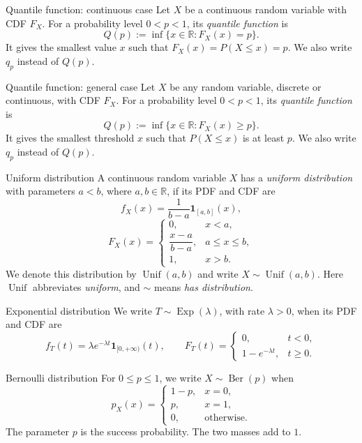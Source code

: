\documentclass[12pt,a4paper,oneside]{report}
\begin{document}
\begin{frameddefn}{Quantile function: continuous case}
\label{def:quantile-continuous}
Let $X$ be a continuous random variable with CDF $F_X$. For a
probability level $0<p<1$, its \emph{quantile function} is
\[
  Q(p):=\inf\{x\in\mathbb R:F_X(x)=p\}.
\]
It gives the smallest value $x$ such that $F_X(x)=P(X\leq x)=p$.
We also write $q_p$ instead of $Q(p)$.
\end{frameddefn}

\begin{frameddefn}{Quantile function: general case}
\label{def:quantile-general}
Let $X$ be any random variable, discrete or continuous, with CDF
$F_X$. For a probability level $0<p<1$, its \emph{quantile function} is
\[
  Q(p):=\inf\{x\in\mathbb R:F_X(x)\geq p\}.
\]
It gives the smallest threshold $x$ such that
$P(X\leq x)$ is at least $p$. We also write $q_p$ instead of $Q(p)$.
\end{frameddefn}

\begin{frameddefn}{Uniform distribution}
\label{def:uniform-distribution}
A continuous random variable $X$ has a \emph{uniform distribution}
with parameters $a<b$, where $a,b\in\mathbb R$, if its PDF and CDF
are
\[
  f_X(x)=\frac{1}{b-a}\mathbf 1_{[a,b]}(x),
\]
\[
  F_X(x)=
  \begin{cases}
    0, & x<a,\\
    \dfrac{x-a}{b-a}, & a\leq x\leq b,\\
    1, & x>b.
  \end{cases}
\]
We denote this distribution by $\operatorname{Unif}(a,b)$ and write
$X\sim\operatorname{Unif}(a,b)$. Here $\operatorname{Unif}$
abbreviates \emph{uniform}, and $\sim$ means \emph{has distribution}.
\end{frameddefn}

\begin{frameddefn}{Exponential distribution}
We write $T\sim\operatorname{Exp}(\lambda)$, with rate $\lambda>0$,
when its PDF and CDF are
\[
  f_T(t)=\lambda e^{-\lambda t}\mathbf1_{[0,+\infty)}(t),
  \qquad
  F_T(t)=
  \begin{cases}
    0,&t<0,\\
    1-e^{-\lambda t},&t\geq0.
  \end{cases}
\]
\end{frameddefn}

\begin{frameddefn}{Bernoulli distribution}
For $0\leq p\leq1$, we write $X\sim\operatorname{Ber}(p)$ when
\[
  p_X(x)=
  \begin{cases}
    1-p,&x=0,\\p,&x=1,\\0,&\text{otherwise}.
  \end{cases}
\]
The parameter $p$ is the success probability. The two masses add
to $1$.
\end{frameddefn}
\end{document}
